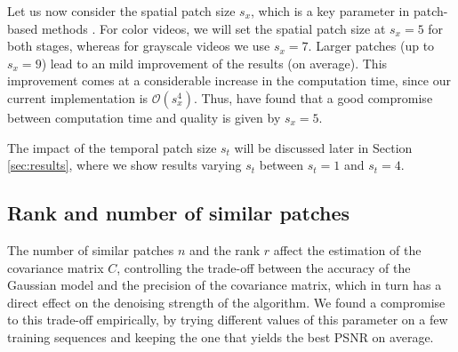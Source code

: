 \documentclass[10pt, a4paper]{article}
\newcommand{\pcomment}[1]{}
\newcommand{\ma}[1]{\boldsymbol{#1}}
\begin{document}
Let us now consider the spatial patch
size $s_x$, which is a key parameter in patch-based methods \cite{Buades2006,Kervrann2006,Boulanger2007}.
%
For color videos, we will set the spatial patch size at $s_x = 5$ for both
stages, whereas for grayscale videos we use $s_x = 7$. Larger patches (up to $s_x = 9$) lead to an mild improvement of the
results (on average). This improvement comes at a considerable increase in the
computation time, since our current implementation is $\mathcal O(s_x^4)$.
Thus, have found that a good compromise between computation time and quality is
given by $s_x = 5$.

The impact of the temporal patch size $s_t$ will be discussed later in Section
\ref{sec:results}, where we show results varying $s_t$ between $s_t = 1$ and $s_t = 4$.

\subsection{Rank and number of similar patches}

The number of similar patches $n$ and the rank $r$ affect the estimation of the covariance
matrix $C$, controlling the trade-off between the accuracy of the Gaussian model
and the precision of the covariance matrix,
which in turn has a direct effect on the denoising strength of the algorithm.
We found a compromise to this trade-off empirically, by trying different values
of this parameter on a few training sequences and keeping the one that yields
the best PSNR on average.
\end{document}
